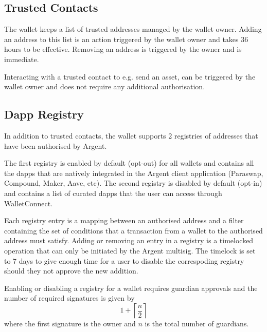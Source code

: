 \documentclass[12pt]{article}
\begin{document}
\subsection{Trusted Contacts}
\label{sec:trusted-contacts}

The wallet keeps a list of trusted addresses managed by the wallet owner.
Adding an address to this list is an action triggered by the wallet owner and takes 36 hours to be effective. Removing an address is triggered by the owner and is immediate.

Interacting with a trusted contact to e.g. send an asset, can be triggered by the wallet owner and does not require any additional authorisation. 

\subsection{Dapp Registry}
\label{sec:authorised-dapps}

In addition to trusted contacts, the wallet supports 2 registries of addresses that have been authorised by Argent.

The first registry is enabled by default (opt-out) for all wallets and contains all the dapps that are natively integrated in the Argent client application (Paraswap, Compound, Maker, Aave, etc). The second registry is disabled by default (opt-in) and contains a list of curated dapps that the user can access through WalletConnect.

Each registry entry is a mapping between an authorised address and a filter containing the set of conditions that a transaction from a wallet to the authorised address must satisfy.
Adding or removing an entry in a registry is a timelocked operation that can only be initiated by the Argent multisig.
The timelock is set to 7 days to give enough time for a user to disable the correspoding registry should they not approve the new addition. 

Enabling or disabling a registry for a wallet requires guardian approvals and the number of required signatures is given by
\begin{equation*}
    1+\left\lceil {\frac{n}{2}} \right\rceil
\end{equation*}
where the first signature is the owner and $n$ is the total number of guardians.
\end{document}
